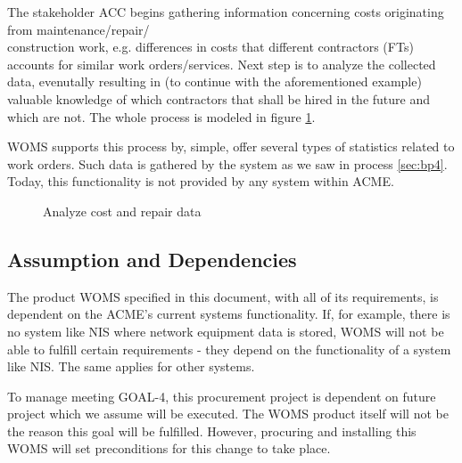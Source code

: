 The stakeholder ACC begins gathering information concerning costs originating from maintenance/repair/\\construction work, e.g. differences in costs that different contractors (FTs) accounts for similar work orders/services.  Next step is to analyze the collected data, evenutally resulting in (to continue with the aforementioned example) valuable knowledge of which contractors that shall be hired in the future and which are not. The whole process is modeled in figure \ref{fig:analyze}.

WOMS supports this process by, simple, offer several types of statistics related to work orders. Such data is gathered by the system as we saw in process \ref{sec:bp4}. Today, this functionality is not provided by any system within ACME.
\begin{figure}[H]
	\centering
	\setlength\fboxsep{7pt}
	\setlength\fboxrule{0.5pt}
	\label{fig:analyze}
	\caption{Analyze cost and repair data}
\end{figure}
%
\subsection{Assumption and Dependencies}
\label{sec:assumption_and_dependencies}
The product WOMS specified in this document, with all of its requirements, is dependent on the ACME's current systems functionality. If, for example, there is no system like NIS where network equipment data is stored, WOMS will not be able to fulfill certain requirements - they depend on the functionality of a system like NIS. The same applies for other systems. 

To manage meeting GOAL-4, this procurement project is dependent on future project which we assume will be executed. The WOMS product itself will not be the reason this goal will be fulfilled. However, procuring and installing this WOMS will set preconditions for this change to take place.

